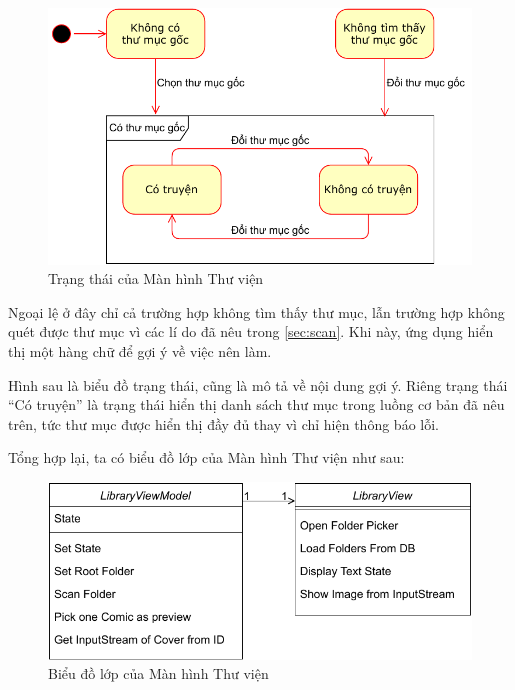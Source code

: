 \documentclass[../../../../thesis]{subfiles}
\begin{document}
\begin{figure}
    \centering
    \includegraphics[width=\linewidth]{../images/library_state.pdf}
    \caption{Trạng thái của Màn hình Thư viện}
    \label{fig:library_state}
\end{figure}

Ngoại lệ ở đây chỉ cả trường hợp không tìm thấy thư mục, lẫn trường hợp không
quét được thư mục vì các lí do đã nêu trong \autoref{sec:scan}. Khi này, ứng
dụng hiển thị một hàng chữ để gợi ý về việc nên làm.

Hình sau là biểu đồ trạng thái, cũng là mô tả về nội dung gợi ý. Riêng trạng
thái ``Có truyện'' là trạng thái hiển thị danh sách thư mục trong luồng cơ bản
đã nêu trên, tức thư mục được hiển thị đầy đủ thay vì chỉ hiện thông báo lỗi.

Tổng hợp lại, ta có biểu đồ lớp của Màn hình Thư viện như sau:

\begin{figure}[H]
    \centering
    \includegraphics[scale=0.85]{../images/library_mvvm_class.pdf}
    \caption{Biểu đồ lớp của Màn hình Thư viện}
    \label{fig:library_mvvm_class}
\end{figure}
\end{document}
